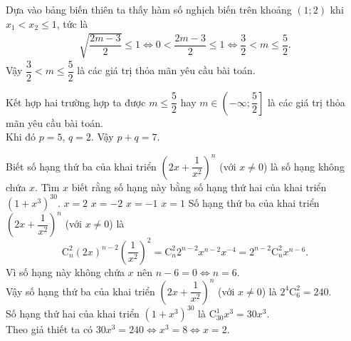 \begin{ex}
{\begin{itemize}
   Dựa vào bảng biến thiên ta thấy hàm số nghịch biến trên khoảng $(1;2)$ khi $x_1 < x_2 \leq 1$, tức là
   \begin{eqnarray*}
    \sqrt{\dfrac{2m-3}{2}} \leq 1 \Leftrightarrow 0 < \dfrac{2m-3}{2} \leq 1 \Leftrightarrow \dfrac{3}{2} < m \leq \dfrac{5}{2}.
   \end{eqnarray*}
   Vậy $\dfrac{3}{2} < m \leq \dfrac{5}{2}$ là các giá trị thỏa mãn yêu cầu bài toán.
  \end{itemize}
  Kết hợp hai trường hợp ta được $m \leq \dfrac{5}{2}$ hay $m \in \left(-\infty;\dfrac{5}{2}\right]$ là các giá trị thỏa mãn yêu cầu bài toán.\\
  Khi đó $p = 5$, $q = 2$. Vậy $p + q = 7$.
  }
\end{ex}


\begin{ex}%
 Biết số hạng thứ ba của khai triển $\left(2x+\dfrac{1}{x^2}\right)^n$ (với $x \neq 0$) là số hạng không chứa $x$. Tìm $x$ biết rằng số hạng này bằng số hạng thứ hai của khai triển $(1+x^3)^{30}$.
 \choice
  {\True $x = 2$}
  {$x = -2$}
  {$x = -1$}
  {$x = 1$}
 \loigiai
  {
  Số hạng thứ ba của khai triển $\left(2x+\dfrac{1}{x^2}\right)^n$ (với $x \neq 0$) là
  $$\mathrm{C}_n^2 (2x)^{n-2} \left( \dfrac{1}{x^2} \right)^2 = \mathrm{C}_n^2 2^{n-2} x^{n-2} x^{-4} = 2^{n-2}\mathrm{C}_n^2 x^{n-6}.$$
  Vì số hạng này không chứa $x$ nên $n-6=0 \Leftrightarrow n=6$.\\
  Vậy số hạng thứ ba của khai triển $\left(2x+\dfrac{1}{x^2}\right)^n$ (với $x \neq 0$) là $2^4\mathrm{C}_6^2 = 240$.\\
  Số hạng thứ hai của khai triển $(1+x^3)^{30}$ là $\mathrm{C}_{30}^1 x^3 = 30x^3$.\\
  Theo giả thiết ta có $30x^3 = 240 \Leftrightarrow x^3 = 8 \Leftrightarrow x = 2$.
  }
\end{ex}


